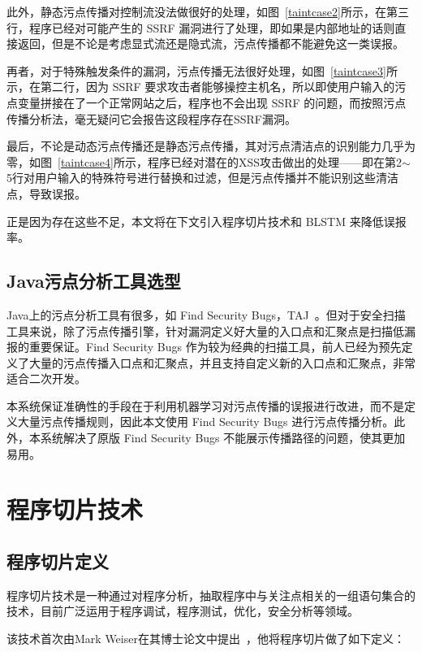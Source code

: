 此外，静态污点传播对控制流没法做很好的处理，如图~\ref{taintcase2}所示，在第三行，程序已经对可能产生的 SSRF 漏洞进行了处理，即如果是内部地址的话则直接返回，但是不论是考虑显式流还是隐式流，污点传播都不能避免这一类误报。

再者，对于特殊触发条件的漏洞，污点传播无法很好处理，如图~\ref{taintcase3}所示，在第二行，因为 SSRF 要求攻击者能够操控主机名，所以即使用户输入的污点变量拼接在了一个正常网站之后，程序也不会出现 SSRF 的问题，而按照污点传播分析法，毫无疑问它会报告这段程序存在SSRF漏洞。

最后，不论是动态污点传播还是静态污点传播，其对污点清洁点的识别能力几乎为零，如图~\ref{taintcase4}所示，程序已经对潜在的XSS攻击做出的处理——即在第2$\sim$5行对用户输入的特殊符号进行替换和过滤，但是污点传播并不能识别这些清洁点，导致误报。    

正是因为存在这些不足，本文将在下文引入程序切片技术和 BLSTM 来降低误报率。

\subsection{Java污点分析工具选型}
Java上的污点分析工具有很多，如 Find Security Bugs，TAJ~\cite{taint:taj}。但对于安全扫描工具来说，除了污点传播引擎，针对漏洞定义好大量的入口点和汇聚点是扫描低漏报的重要保证。Find Security Bugs 作为较为经典的扫描工具，前人已经为预先定义了大量的污点传播入口点和汇聚点，并且支持自定义新的入口点和汇聚点，非常适合二次开发。

本系统保证准确性的手段在于利用机器学习对污点传播的误报进行改进，而不是定义大量污点传播规则，因此本文使用 Find Security Bugs 进行污点传播分析。此外，本系统解决了原版 Find Security Bugs 不能展示传播路径的问题，使其更加易用。

\section{程序切片技术}
\subsection{程序切片定义}
程序切片技术是一种通过对程序分析，抽取程序中与关注点相关的一组语句集合的技术，目前广泛运用于程序调试，程序测试，优化，安全分析等领域。

该技术首次由Mark Weiser在其博士论文中提出~\cite{slices:weiser1979}，他将程序切片做了如下定义：

